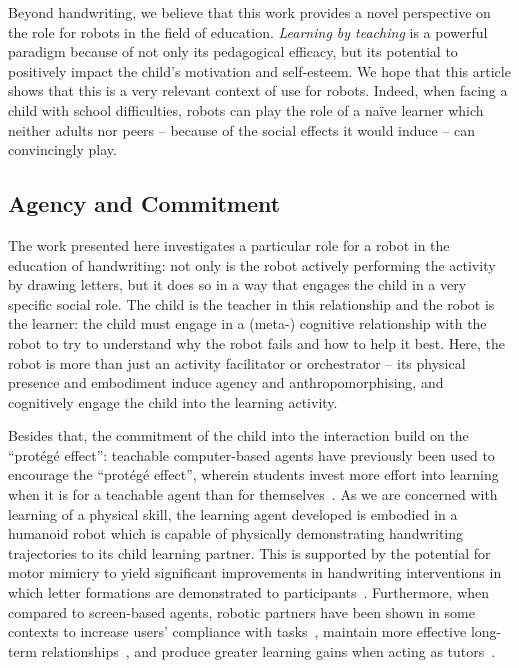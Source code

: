 \documentclass{article}
\begin{document}
Beyond handwriting, we believe that this work provides a novel perspective on
the role for robots in the field of education. \emph{Learning by teaching} is a
powerful paradigm because of not only its pedagogical efficacy, but its
potential to positively impact the child's motivation and self-esteem. We hope that 
this article shows that this is a very relevant context of use for robots. Indeed,
when facing a child with school difficulties, robots can play the role of a na\"ive 
learner which neither adults nor peers -- because of the social effects it would 
induce -- can convincingly play.

\subsection{Agency and Commitment}

The work presented here investigates a particular role for a robot in the
education of handwriting: not only is the robot actively performing the activity
by drawing letters, but it does so in a way that engages the child in a very
specific social role. The child is the teacher in this relationship and the
robot is the learner: the child must engage in a (meta-) cognitive relationship
with the robot to try to understand why the robot fails and how to help it best.
Here, the robot is more than just an activity facilitator or orchestrator -- its
physical presence and embodiment induce agency and anthropomorphising, and
cognitively engage the child into the learning activity.

Besides that, the commitment of the child into the interaction build on the
``protégé effect'': teachable computer-based agents have previously been used to
encourage the ``protégé effect'', wherein students invest more effort into
learning when it is for a teachable agent than for themselves~\cite{Chase2009}.
As we are concerned with learning of a physical skill, the learning agent
developed is embodied in a humanoid robot which is capable of physically
demonstrating handwriting trajectories to its child learning partner.  This is
supported by the potential for motor mimicry to yield significant improvements
in handwriting interventions in which letter formations are demonstrated to
participants~\cite{Berninger1997}. Furthermore, when compared to screen-based
agents, robotic partners have been shown in some contexts to increase users'
compliance with tasks~\cite{Bainbridge2011}, maintain more effective long-term
relationships~\cite{Kidd2008}, and produce greater learning gains when acting as
tutors~\cite{Leyzberg2012}.
\end{document}
